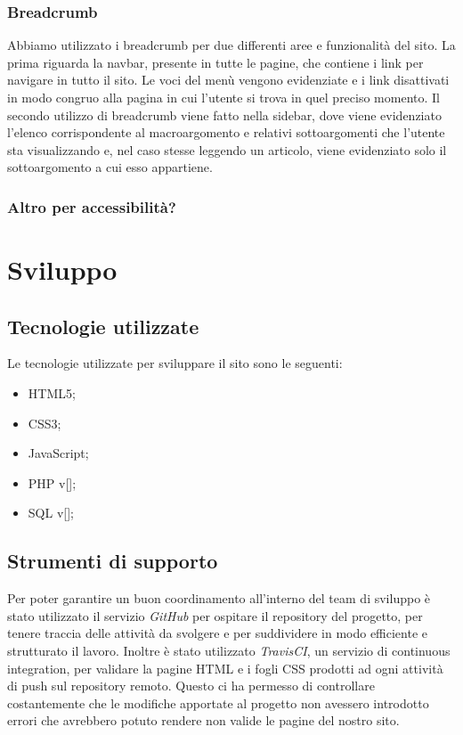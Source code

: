 \documentclass[12pt]{article}
\begin{document}
	\subsubsection{Breadcrumb}
	Abbiamo utilizzato i breadcrumb per due differenti aree e funzionalità del sito. La prima riguarda la navbar, presente in tutte le pagine, che contiene i link per navigare in tutto il sito. Le voci del menù vengono evidenziate e i link disattivati in modo congruo alla pagina in cui l'utente si trova in quel preciso momento. Il secondo utilizzo di breadcrumb viene fatto nella sidebar, dove viene evidenziato l'elenco corrispondente al macroargomento e relativi sottoargomenti che l'utente sta visualizzando e, nel caso stesse leggendo un articolo, viene evidenziato solo il sottoargomento a cui esso appartiene.
	
	\subsubsection{Altro per accessibilità?}
	

	\section{Sviluppo}
	\subsection{Tecnologie utilizzate}
	Le tecnologie utilizzate per sviluppare il sito sono le seguenti:
	\begin{itemize}
		\item HTML5;
		\item CSS3;
		\item JavaScript;
		\item PHP v[];
		\item SQL v[];
	\end{itemize}
	\subsection{Strumenti di supporto}
	Per poter garantire un buon coordinamento all'interno del team di sviluppo è stato utilizzato il servizio \emph{GitHub} per ospitare il repository del progetto, per tenere traccia delle attività da svolgere e per suddividere in modo efficiente e strutturato il lavoro. Inoltre è stato utilizzato \emph{TravisCI}, un servizio di continuous integration, per validare la pagine HTML e i fogli CSS prodotti ad ogni attività di push sul repository remoto. Questo ci ha permesso di controllare costantemente che le modifiche apportate al progetto non avessero introdotto errori che avrebbero potuto rendere non valide le pagine del nostro sito.
\end{document}
